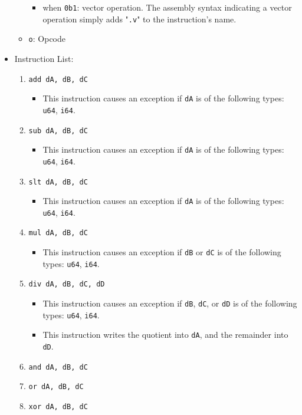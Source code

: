 \documentclass{article}
\begin{document}
\begin{itemize}
\begin{itemize}
\begin{itemize}
				\item when \texttt{0b1}:  vector operation.  The assembly
				syntax indicating a vector operation simply adds
				"\texttt{.v}" to the instruction's name.
				\end{itemize}
			\item \texttt{o}:  Opcode
			\end{itemize}
		\item Instruction List:
			\begin{enumerate}
			\item \texttt{add dA, dB, dC}
				\begin{itemize}
				\item This instruction causes an exception if \texttt{dA}
				is of the following types:  \texttt{u64}, \texttt{i64}.
				\end{itemize}
			\item \texttt{sub dA, dB, dC}
				\begin{itemize}
				\item This instruction causes an exception if \texttt{dA}
				is of the following types:  \texttt{u64}, \texttt{i64}.
				\end{itemize}
			\item \texttt{slt dA, dB, dC}
				\begin{itemize}
				\item This instruction causes an exception if \texttt{dA}
				is of the following types:  \texttt{u64}, \texttt{i64}.
				\end{itemize}
			\item \texttt{mul dA, dB, dC}
				\begin{itemize}
				\item This instruction causes an exception if \texttt{dB}
				or \texttt{dC} is of the following types:  \texttt{u64},
				\texttt{i64}.
				\end{itemize}

			\item \texttt{div dA, dB, dC, dD}
				\begin{itemize}
				\item This instruction causes an exception if \texttt{dB},
				\texttt{dC}, or \texttt{dD} is of the following types:
				\texttt{u64}, \texttt{i64}.

				\item This instruction writes the quotient into
				\texttt{dA}, and the remainder into \texttt{dD}.
				\end{itemize}
			\item \texttt{and dA, dB, dC}
			\item \texttt{or dA, dB, dC}
			\item \texttt{xor dA, dB, dC}


\end{enumerate}
\end{itemize}
\end{document}
